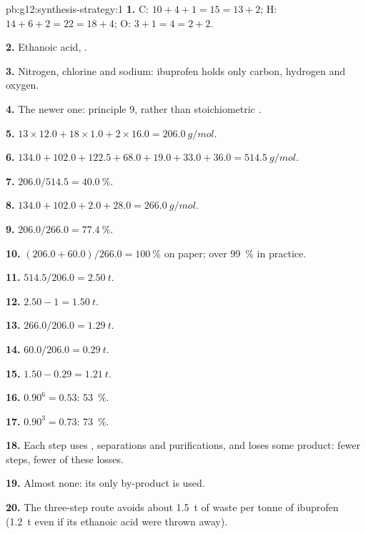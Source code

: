 \begin{solution}{pb:g12:synthesis-strategy:1}
\textbf{1.} C: $10 + 4 + 1 = 15 = 13 + 2$; H: $14 + 6 + 2 = 22 = 18 + 4$;
O: $3 + 1 = 4 = 2 + 2$.

\textbf{2.} Ethanoic acid, .

\textbf{3.} Nitrogen, chlorine and sodium: ibuprofen holds only carbon,
hydrogen and oxygen.

\textbf{4.} The newer one: principle 9,  rather than
stoichiometric .

\textbf{5.} $13 \times 12.0 + 18 \times 1.0 + 2 \times 16.0 =
\qty{206.0}{g/mol}$.

\textbf{6.} $134.0 + 102.0 + 122.5 + 68.0 + 19.0 + 33.0 + 36.0 =
\qty{514.5}{g/mol}$.

\textbf{7.} $206.0/514.5 = \qty{40.0}{\percent}$.

\textbf{8.} $134.0 + 102.0 + 2.0 + 28.0 = \qty{266.0}{g/mol}$.

\textbf{9.} $206.0/266.0 = \qty{77.4}{\percent}$.

\textbf{10.} $(206.0 + 60.0)/266.0 = \qty{100}{\percent}$ on paper; over
\qty{99}{\percent} in practice.

\textbf{11.} $514.5/206.0 = \qty{2.50}{t}$.

\textbf{12.} $2.50 - 1 = \qty{1.50}{t}$.

\textbf{13.} $266.0/206.0 = \qty{1.29}{t}$.

\textbf{14.} $60.0/206.0 = \qty{0.29}{t}$.

\textbf{15.} $1.50 - 0.29 = \qty{1.21}{t}$.

\textbf{16.} $0.90^6 = 0.53$: \qty{53}{\percent}.

\textbf{17.} $0.90^3 = 0.73$: \qty{73}{\percent}.

\textbf{18.} Each step uses , separations and purifications, and
loses some product: fewer steps, fewer of these losses.

\textbf{19.} Almost none: its only by-product is used.

\textbf{20.} The three-step route avoids about \qty{1.5}{t} of waste per
tonne of ibuprofen (\qty{1.2}{t} even if its ethanoic acid were thrown
away).
\end{solution}
